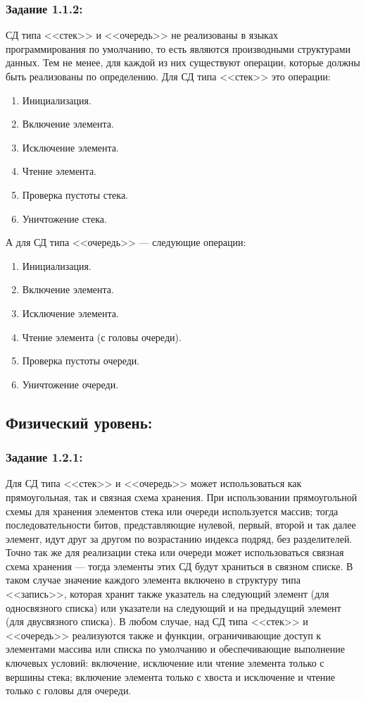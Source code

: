 \documentclass[12pt]{article}
\begin{document}
{	\subsubsection{Задание 1.1.2:}
	\label{task_1_1_2}
	СД типа <<стек>> и <<очередь>> не реализованы в языках программирования по умолчанию, то есть являются производными структурами данных. Тем не менее, для каждой из них существуют операции, которые должны быть реализованы по определению. Для СД типа <<стек>> это операции:
	
	\begin{enumerate}
	\item Инициализация.
	\item Включение элемента.
	\item Исключение элемента.
	\item Чтение элемента.
	\item Проверка пустоты стека.
	\item Уничтожение стека.
	\end{enumerate}
	
	А для СД типа <<очередь>> --- следующие операции:
	\begin{enumerate}
	\item Инициализация.
	\item Включение элемента.
	\item Исключение элемента.
	\item Чтение элемента (с головы очереди).
	\item Проверка пустоты очереди.
	\item Уничтожение очереди.
	\end{enumerate}
	
	\subsection{Физический уровень:}
	\label{task_1_2}
	\subsubsection{Задание 1.2.1:}
	\label{task_1_2_1}
	Для СД типа <<стек>> и <<очередь>> может использоваться как прямоугольная, так и связная схема хранения. При использовании прямоугольной схемы для хранения элементов стека или очереди используется массив; тогда последовательности битов, представляющие нулевой, первый, второй и так далее элемент, идут друг за другом по возрастанию индекса подряд, без разделителей. Точно так же для реализации стека или очереди может использоваться связная схема хранения --- тогда элементы этих СД будут храниться в связном списке. В таком случае значение каждого элемента включено в структуру типа <<запись>>, которая хранит также указатель на следующий элемент (для односвязного списка) или указатели на следующий и на предыдущий элемент (для двусвязного списка). В любом случае, над СД типа <<стек>> и <<очередь>> реализуются также и функции, ограничивающие доступ к элементами массива или списка по умолчанию и обеспечивающие выполнение ключевых условий: включение, исключение или чтение элемента только с вершины стека; включение элемента только с хвоста и исключение и чтение только с головы для очереди.
	
}
\end{document}

